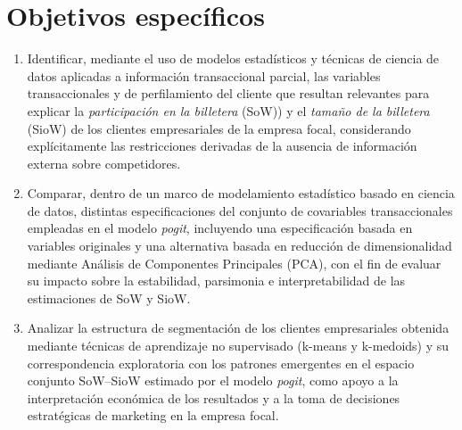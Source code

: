 \section{Objetivos específicos}

\begin{enumerate}
    \item Identificar, mediante el uso de modelos estadísticos y técnicas de ciencia de datos aplicadas a información transaccional parcial, las variables transaccionales y de perfilamiento del cliente que resultan relevantes para explicar la \emph{participación en la billetera} (SoW)) y el \emph{tamaño de la billetera} (SioW) de los clientes empresariales de la empresa focal, considerando explícitamente las restricciones derivadas de la ausencia de información externa sobre competidores.

    \item Comparar, dentro de un marco de modelamiento estadístico basado en ciencia de datos, distintas especificaciones del conjunto de covariables transaccionales empleadas en el modelo \emph{pogit}, incluyendo una especificación basada en variables originales y una alternativa basada en reducción de dimensionalidad mediante Análisis de Componentes Principales (PCA), con el fin de evaluar su impacto sobre la estabilidad, parsimonia e interpretabilidad de las estimaciones de SoW y SioW.

    \item Analizar la estructura de segmentación de los clientes empresariales obtenida mediante técnicas de aprendizaje no supervisado (k-means y k-medoids) y su correspondencia exploratoria con los patrones emergentes en el espacio conjunto SoW--SioW estimado por el modelo \emph{pogit}, como apoyo a la interpretación económica de los resultados y a la toma de decisiones estratégicas de marketing en la empresa focal.
\end{enumerate}


